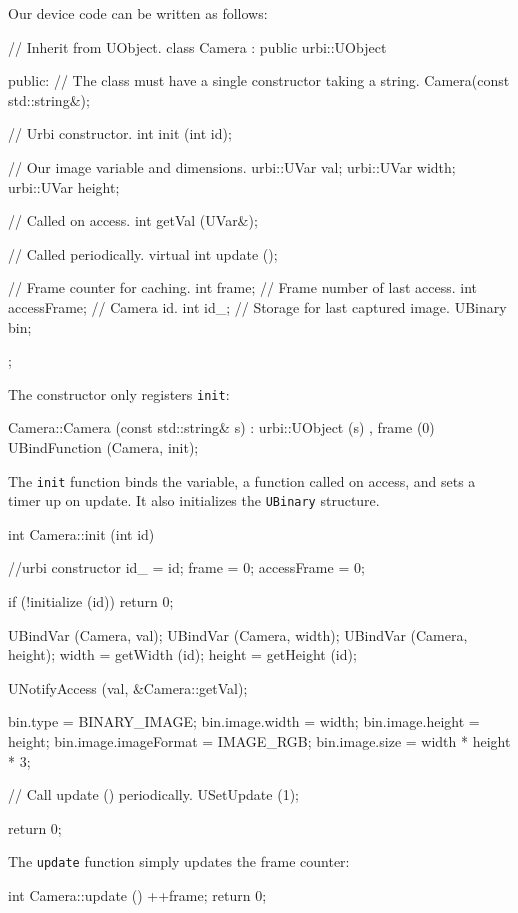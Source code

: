Our device code can be written as follows:
\begin{cxx}
// Inherit from UObject.
class Camera : public urbi::UObject
{
public:
  // The class must have a single constructor taking a string.
  Camera(const std::string&);

  // Urbi constructor.
  int init (int id);

  // Our image variable and dimensions.
  urbi::UVar val;
  urbi::UVar width;
  urbi::UVar height;

  // Called on access.
  int getVal (UVar&);

  // Called periodically.
  virtual int update ();

  // Frame counter for caching.
  int frame;
  // Frame number of last access.
  int accessFrame;
  // Camera id.
  int id_;
  // Storage for last captured image.
  UBinary bin;
};
\end{cxx}

The constructor only registers \lstinline{init}:

\begin{cxx}
Camera::Camera (const std::string& s)
  : urbi::UObject (s)
  , frame (0)
{
  UBindFunction (Camera, init);
}
\end{cxx}

The \lstinline{init} function binds the variable, a function called on
access, and sets a timer up on update. It also initializes the
\lstinline{UBinary} structure.

\begin{cxx}
int
Camera::init (int id)
{
  //urbi constructor
  id_ = id;
  frame = 0;
  accessFrame = 0;

  if (!initialize (id))
    return 0;

  UBindVar (Camera, val);
  UBindVar (Camera, width);
  UBindVar (Camera, height);
  width = getWidth (id);
  height = getHeight (id);

  UNotifyAccess (val, &Camera::getVal);

  bin.type = BINARY_IMAGE;
  bin.image.width = width;
  bin.image.height = height;
  bin.image.imageFormat = IMAGE_RGB;
  bin.image.size = width * height * 3;

  // Call update () periodically.
  USetUpdate (1);

  return 0;
}
\end{cxx}

The \lstinline{update} function simply updates the frame counter:

\begin{cxx}
int
Camera::update ()
{
  ++frame;
  return 0;
}
\end{cxx}

